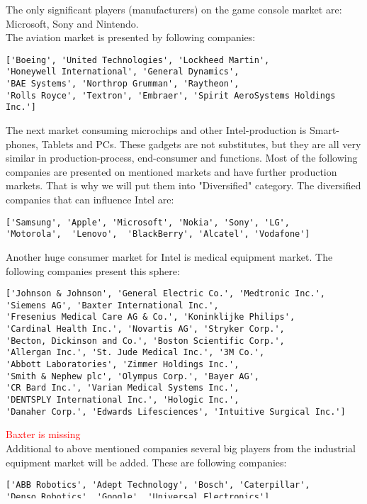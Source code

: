 \documentclass[12pt, a4paper]{article}
\begin{document}
The only significant players (manufacturers) on the game console market are: Microsoft, Sony and Nintendo.\\ 
The aviation market is presented by following companies: 
\begin{verbatim}
['Boeing', 'United Technologies', 'Lockheed Martin',
'Honeywell International', 'General Dynamics',
'BAE Systems', 'Northrop Grumman', 'Raytheon',
'Rolls Royce', 'Textron', 'Embraer', 'Spirit AeroSystems Holdings Inc.']
\end{verbatim}
The next market consuming microchips and other Intel-production is Smart-phones, Tablets and PCs. These gadgets are not substitutes, but they are all very similar in production-process, end-consumer and functions. Most of the following companies are presented on mentioned markets and have further production markets. That is why we will put them into "Diversified" category. The diversified companies that can influence Intel are:
\begin{verbatim}
['Samsung', 'Apple', 'Microsoft', 'Nokia', 'Sony', 'LG',
'Motorola',  'Lenovo',  'BlackBerry', 'Alcatel', 'Vodafone']
\end{verbatim} 
Another huge consumer market for Intel is medical equipment market. The following companies present this sphere:
\begin{verbatim}
['Johnson & Johnson', 'General Electric Co.', 'Medtronic Inc.',
'Siemens AG', 'Baxter International Inc.', 
'Fresenius Medical Care AG & Co.', 'Koninklijke Philips',
'Cardinal Health Inc.', 'Novartis AG', 'Stryker Corp.',
'Becton, Dickinson and Co.', 'Boston Scientific Corp.',
'Allergan Inc.', 'St. Jude Medical Inc.', '3M Co.',
'Abbott Laboratories', 'Zimmer Holdings Inc.', 
'Smith & Nephew plc', 'Olympus Corp.', 'Bayer AG',
'CR Bard Inc.', 'Varian Medical Systems Inc.',
'DENTSPLY International Inc.', 'Hologic Inc.', 
'Danaher Corp.', 'Edwards Lifesciences', 'Intuitive Surgical Inc.']
\end{verbatim}
\textcolor{red}{Baxter is missing}\\
Additional to above mentioned companies several big players from the industrial equipment market will be added. These are following companies:
\begin{verbatim}
['ABB Robotics', 'Adept Technology', 'Bosch', 'Caterpillar',
'Denso Robotics', 'Google', 'Universal Electronics']
\end{verbatim}
Intel diversified their structure that way, so that they have reduced the transportation and production costs, and made their production more flexible. This why we don't have to consider the suppliers companies in his work.\\
\end{document}
